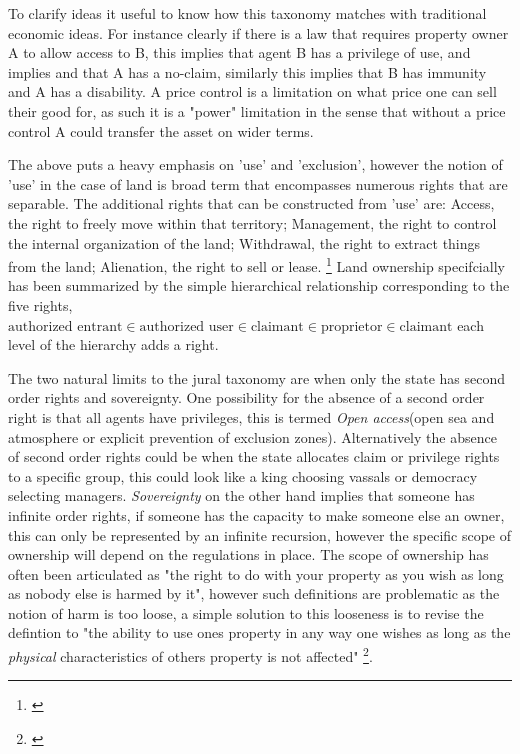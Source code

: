 \documentclass[12pt]{article}
\numberwithin{equation}{section}
\begin{document}
To clarify ideas it useful to know how this taxonomy matches with traditional economic ideas. For instance clearly if there is a law that requires property owner A to allow access to B, this implies that agent B has a privilege of use, and implies and that A has a no-claim, similarly this implies that B has immunity and A has a disability. A price control is a limitation on what price one can sell their good for, as such it is a "power" limitation in the sense that without a price control A could transfer the asset on wider terms. 

The above puts a heavy emphasis on 'use' and 'exclusion', however the notion of 'use' in the case of land is broad term that encompasses numerous rights that are separable. The additional rights that can be constructed from 'use' are: Access, the right to freely move within that territory; Management, the right to control the internal organization of the land; Withdrawal, the right to extract things from the land; Alienation, the right to sell or lease. \footnote{\cite{ostrom2010private}}
Land ownership specifcially has been summarized by the simple hierarchical relationship corresponding to the five rights, $\text{authorized entrant} \in \text{authorized user}  \in \text{claimant}  \in \text{proprietor} \in \text{claimant}$ each level of the hierarchy adds a right. \cite{schlager1992property}


The two natural limits to the jural taxonomy are when only the state has second order rights and sovereignty. One possibility for the absence of a second order right is that all agents have privileges, this is termed \textit{Open access}(open sea and atmosphere or explicit prevention of exclusion zones). Alternatively the absence of second order rights could be when the state allocates claim or privilege rights to a specific group, this could look like a king choosing vassals or democracy selecting managers. \textit{Sovereignty} on the other hand implies that someone has infinite order rights, if someone has the capacity to make someone else an owner, this can only be represented by an infinite recursion, however the specific scope of ownership will depend on the regulations in place. The scope of ownership has often been articulated as "the right to do with your property as you wish as long as nobody else is harmed by it", however such definitions are problematic as the notion of harm is too loose, a simple solution to this looseness is to revise the defintion to "the ability to use ones property in any way one wishes as long as the \textit{physical} characteristics of others property is not affected" \footnote{\cite{Alchian1965}}.
\end{document}
